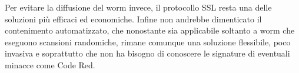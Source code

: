 Per evitare la diffusione del worm invece, il protocollo SSL resta una delle soluzioni più efficaci ed economiche. 
Infine non andrebbe dimenticato il contenimento automatizzato, che nonostante sia applicabile soltanto a worm che eseguono scansioni randomiche, rimane comunque una soluzione flessibile, poco invasiva e soprattutto che non ha bisogno di conoscere le signature di eventuali minacce come Code Red.\\
